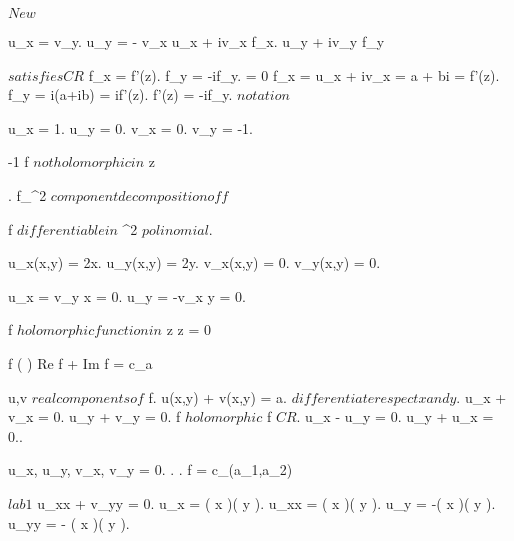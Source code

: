 \documentclass[../Main/main]{subfiles}
\begin{document}
\unit{ $ New $ }
{

	{
		{
		}
		{
			u_x = v_y.
			u_y = - v_x
		}
		\denote
		{
			u_x + iv_x \as f_x.
			u_y + iv_y \as f_y
		}
	}
	
	
	{
		{
			 $ satisfies CR $
		}
		\holds
		{
			f_x = f'(z).
			f_y = -if_y.
			 = 0
		}
		\demonstration
		{
			f_x = u_x + iv_x = a + bi = f'(z).
			f_y = i(a+ib) = if'(z).
			f'(z) = -if_y.
			$notation$
		}
	}


	{
		{
		}
		{
			u_x = 1.
			u_y = 0.
			v_x = 0.
			v_y = -1.

			{
				-1  \imp f $ not holomorphic in $ z
			}
		}
	}


	{
		{
			.
			f_{\R^2} $ component decomposition of f $
		}
		{
			f $ differentiable in $ \R^2 $ polinomial $.
			{
				u_x(x,y) = 2x.
				u_y(x,y) = 2y.
				v_x(x,y) = 0.
				v_y(x,y) = 0.

				u_x = v_y \ifandonlyif x = 0.
				u_y = -v_x \ifandonlyif y = 0.

				f $ holomorphic function in $ z \ifandonlyif z = 0
			}
		}
	}
	

	{
		{
			f \in \Hc( \C ) \suchthat Re f + Im f = c_a
		}
		\showthat
		{
		}
		\demonstration
		{
			u,v $ real components of $ f.
			u(x,y) + v(x,y) = a.
			$ differentiate respect x and y $.
			u_x + v_x = 0.
			u_y + v_y = 0.
			f $ holomorphic $ \imp f $ CR $.
			u_x - u_y = 0.
			u_y + u_x = 0..

			u_x, u_y, v_x, v_y = 0.
			.
			.
			f = c_{(a_1,a_2)}
		}
	}


	{
		{
		}
		\showthat
		{
		}
		\demonstration
		{
			$lab 1$ \imp u_{xx} + v_{yy} = 0.
			u_x = \exp( x )\cos( y ).
			u_{xx} = \exp( x )\cos( y ).
			u_y = -\exp( x )\sin( y ).
			u_{yy} = - \exp( x )\cos( y ).

}}}
\end{document}
